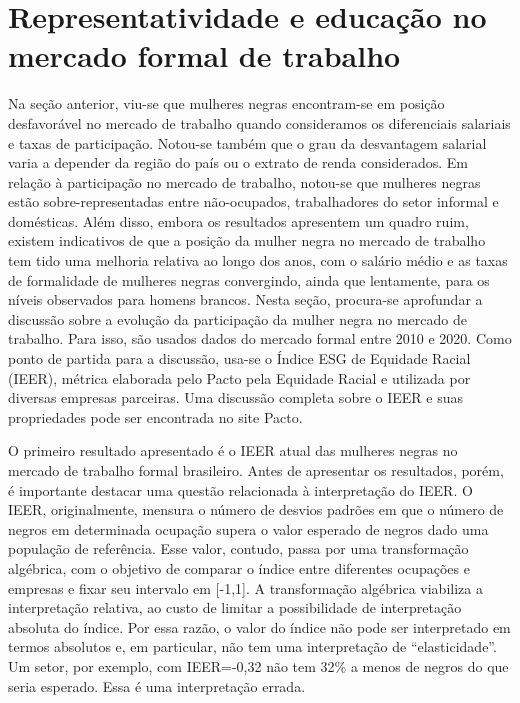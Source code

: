 \documentclass[12pt]{article}
\begin{document}
\section{Representatividade e educação no mercado formal de trabalho} \label{rais_representatividade}

\par Na seção anterior, viu-se que mulheres negras encontram-se em posição desfavorável no mercado de trabalho quando consideramos os diferenciais salariais e taxas de participação. Notou-se também que o grau da desvantagem salarial varia a depender da região do país ou o extrato de renda considerados. Em relação à participação no mercado de trabalho, notou-se que mulheres negras estão sobre-representadas entre não-ocupados, trabalhadores do setor informal e domésticas. Além disso, embora os resultados apresentem um quadro ruim, existem indicativos de que a posição da mulher negra no mercado de trabalho tem tido uma melhoria relativa ao longo dos anos, com o salário médio e as taxas de formalidade de mulheres negras convergindo, ainda que lentamente, para os níveis observados para homens brancos. Nesta seção, procura-se aprofundar a discussão sobre a evolução da participação da mulher negra no mercado de trabalho. Para isso, são usados dados do mercado formal entre 2010 e 2020. Como ponto de partida para a discussão, usa-se o Índice ESG de Equidade Racial (IEER), métrica elaborada pelo Pacto pela Equidade Racial e utilizada por diversas empresas parceiras. Uma discussão completa sobre o IEER e suas propriedades pode ser encontrada no site Pacto. 

\par O primeiro resultado apresentado é o IEER atual das mulheres negras no mercado de trabalho formal brasileiro. Antes de apresentar os resultados, porém, é importante destacar uma questão relacionada à interpretação do IEER. O IEER, originalmente, mensura o número de desvios padrões em que o número de negros em determinada ocupação supera o valor esperado de negros dado uma população de referência. Esse valor, contudo, passa por uma transformação algébrica, com o objetivo de comparar o índice entre diferentes ocupações e empresas e fixar seu intervalo em [-1,1]. A transformação algébrica viabiliza a interpretação relativa, ao custo de limitar a possibilidade de interpretação absoluta do índice. Por essa razão, o valor do índice não pode ser interpretado em termos absolutos e, em particular, não tem uma interpretação de \enquote{elasticidade}. Um setor, por exemplo, com IEER=-0,32 não tem 32\% a menos de negros do que seria esperado. Essa é uma interpretação errada.
\end{document}
